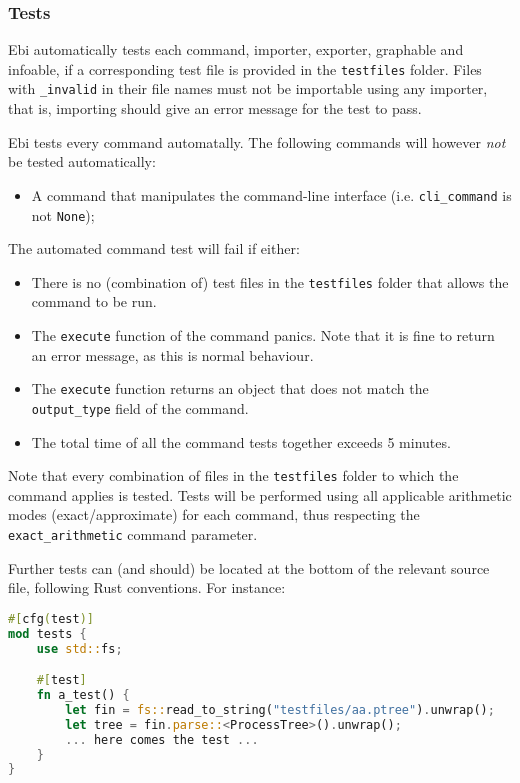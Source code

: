 \documentclass{article}
\begin{document}
        \subsubsection{Tests}
        \label{sec:tests}
            Ebi automatically tests each command, importer, exporter, graphable and infoable, if a corresponding test file is provided in the \verb=testfiles= folder.
            Files with \verb=_invalid= in their file names must not be importable using any importer, that is, importing should give an error message for the test to pass.

            Ebi tests every command automatally.
            The following commands will however \emph{not} be tested automatically:
            \begin{itemize}
                \item A command that manipulates the command-line interface (i.e. \verb=cli_command= is not \verb=None=);
            \end{itemize}
            The automated command test will fail if either:
            \begin{itemize}
                \item There is no (combination of) test files in the \verb=testfiles= folder that allows the command to be run.
                \item The \verb=execute= function of the command panics.
                Note that it is fine to return an error message, as this is normal behaviour.
                \item The \verb=execute= function returns an object that does not match the \verb=output_type= field of the command.
                \item The total time of all the command tests together exceeds 5 minutes.
            \end{itemize}
            Note that every combination of files in the \verb=testfiles= folder to which the command applies is tested.
            Tests will be performed using all applicable arithmetic modes (exact/approximate) for each command, thus respecting the \verb=exact_arithmetic= command parameter.

            Further tests can (and should) be located at the bottom of the relevant source file, following Rust conventions.
            For instance:
\begin{lstlisting}[language=Rust, style=boxed]
#[cfg(test)]
mod tests {
    use std::fs;

    #[test]
    fn a_test() {
        let fin = fs::read_to_string("testfiles/aa.ptree").unwrap();
        let tree = fin.parse::<ProcessTree>().unwrap();
        ... here comes the test ...
    }
}
\end{lstlisting}
\end{document}
